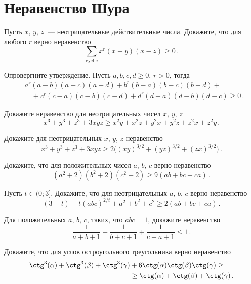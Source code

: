 
\section*{Неравенство Шура}


\begin{problems}

\item
Пусть $x$, $y$, $z$~--- неотрицательные действительные числа.
Докажите, что для любого $r$ верно неравенство
\[
    \sum_{\mathrm{cyclic}}
        x^r (x - y) (x - z)
\geq
    0
\, . \]

\item
Опровергните утверждение.
Пусть $a, b, c, d \geq 0$, $r > 0$, тогда
\begin{align*} &
    a^r (a - b) (a - c) (a - d) +
    b^r (b - a) (b - c) (b - d)
    + {} \\ & \quad +
    c^r (c - a) (c - b) (c - d) +
    d^r (d - a) (d - b) (d - c)
\geq
    0
\, . \end{align*}

\item
Докажите неравенство для неотрицательных чисел $x$, $y$, $z$
\[
    x^3 + y^3 + z^3 + 3 x y z
\geq
    x^2 y + x^2 z + y^2 x + y^2 z + z^2 x + z^2 y
\, . \]

\item
Докажите для неотрицательных $x$, $y$, $z$ неравенство
\[
    x^3 + y^3 + z^3 + 3 x y z
\geq
    2 \bigl( (x y)^{3/2} + (y z)^{3/2} + (z x)^{3/2} \bigr)
\, . \]

\item
Докажите, что для положительных чисел $a$, $b$, $c$ верно неравенство
\[
    (a^2 + 2) (b^2 + 2) (c^2 + 2)
\geq
    9 (a b + b c + c a)
\, . \]

\item
Пусть $t \in (0; 3]$.
Докажите, что для неотрицательных $a$, $b$, $c$ верно неравенство
\[
    (3 - t) + t (a b c)^{2/t} + a^2 + b^2 + c^2
\geq
    2 (a b + b c + c a)
\, . \]

\item
Для положительных $a$, $b$, $c$, таких, что $a b c  = 1$, докажите
неравенство
\[
    \frac{1}{a + b + 1} +
    \frac{1}{b + c + 1} +
    \frac{1}{c + a + 1}
\leq
    1
\, . \]

\item
Докажите, что для углов остроугольного треугольника верно неравенство
\begin{align*}
    \ctg^3(\alpha) + \ctg^3(\beta) + \ctg^3(\gamma)
    & +
    6 \ctg(\alpha) \ctg(\beta) \ctg(\gamma)
\geq \\ & \geq
    \ctg(\alpha) + \ctg(\beta) + \ctg(\gamma)
\, . \end{align*}


\end{problems}
